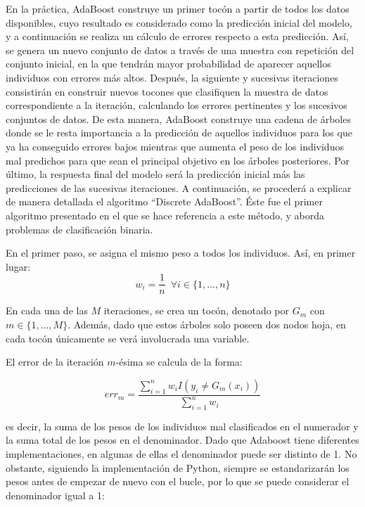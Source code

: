 \documentclass[12pt,twoside]{article}
\begin{document}
En la práctica, AdaBoost construye un primer tocón a partir de todos los datos disponibles, cuyo resultado es considerado como la predicción inicial del modelo, y a continuación se realiza un cálculo de errores respecto a esta predicción. Así, se genera un nuevo conjunto de datos a través de una muestra con repetición del conjunto inicial, en la que tendrán mayor probabilidad de aparecer aquellos individuos con errores más altos. Después, la siguiente y sucesivas iteraciones consistirán en construir nuevos tocones que clasifiquen la muestra de datos correspondiente a la iteración, calculando los errores pertinentes y los sucesivos conjuntos de datos. De esta manera, AdaBoost construye una cadena de árboles donde se le resta importancia a la predicción de aquellos individuos para los que ya ha conseguido errores bajos mientras que aumenta el peso de los individuos mal predichos para que sean el principal objetivo en los árboles posteriores. Por último, la respuesta final del modelo será la predicción inicial más las predicciones de las sucesivas iteraciones. A continuación, se procederá a explicar de manera detallada el algoritmo ``Discrete AdaBoost''. Éste fue el primer algoritmo presentado en el que se hace referencia a este método, y aborda problemas de clasificación binaria. 

En el primer paso, se asigna el mismo peso a todos los individuos. Así, en primer lugar:
\begin{equation*}
w_i = \frac{1}{n} \, \, \, \forall i \in \{1, \dots, n \}
\end{equation*}

En cada una de las $M$ iteraciones, se crea un tocón, denotado por $G_m$ con $m \in \{1, \dots, M \}$. Además, dado que estos árboles solo poseen dos nodos hoja, en cada tocón únicamente se verá involucrada una variable.

El error de la iteración $m$-ésima se calcula de la forma:

\begin{equation*}
err_m = \frac{\sum_{i=1}^{n} w_i I(y_i \neq G_m(x_i))}{\sum_{i=1}^{n} w_i} 
\end{equation*}

\noindent
es decir, la suma de los pesos de los individuos mal clasificados en el numerador y la suma total de los pesos en el denominador. Dado que Adaboost tiene diferentes implementaciones, en algunas de ellas el denominador puede ser distinto de 1. No obstante, siguiendo la implementación de Python, siempre se estandarizarán los pesos antes de empezar de nuevo con el bucle, por lo que se puede considerar el denominador igual a 1:
\end{document}

